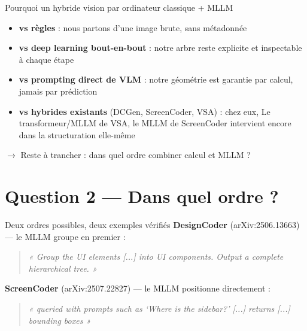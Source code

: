 \documentclass[11pt]{beamer}
\begin{document}
\begin{frame}{Pourquoi un hybride vision par ordinateur classique + MLLM}
  \small
  \begin{itemize}
    \item \textbf{vs règles} : nous partons d'une image brute, sans métadonnée
    \item \textbf{vs deep learning bout-en-bout} : notre arbre reste explicite et
      inspectable à chaque étape
    \item \textbf{vs prompting direct de VLM} : notre géométrie est garantie par
      calcul, jamais par prédiction
    \item \textbf{vs hybrides existants} (DCGen, ScreenCoder, VSA) : chez eux,
      Le transformeur/MLLM de VSA, le MLLM de ScreenCoder intervient encore dans la structuration elle-même
  \end{itemize}

  \vspace{1em}
  \alert{$\rightarrow$ Reste à trancher : dans quel ordre combiner calcul et MLLM ?}
\end{frame}

\section{Question 2 --- Dans quel ordre ?}

\begin{frame}{Deux ordres possibles, deux exemples vérifiés}
  \textbf{DesignCoder} (arXiv:2506.13663) --- le MLLM groupe en premier :
  \begin{quote}
    \small \textit{« Group the UI elements [...] into UI components. Output a
    complete hierarchical tree. »}
  \end{quote}

  \textbf{ScreenCoder} (arXiv:2507.22827) --- le MLLM positionne directement :
  \begin{quote}
    \small \textit{« queried with prompts such as `Where is the sidebar?' [...]
    returns [...] bounding boxes »}
  \end{quote}
\end{frame}
\end{document}
